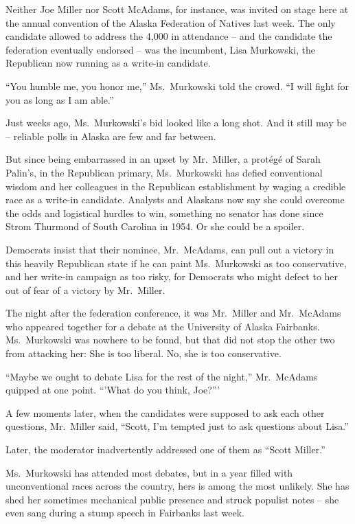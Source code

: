 ﻿\documentclass[12pt]{article}
\begin{document}
Neither Joe Miller nor Scott McAdams, for instance, was invited on stage here at the annual
convention of the Alaska Federation of Natives last week. The only candidate allowed to address the
4,000 in attendance -- and the candidate the federation eventually endorsed -- was the incumbent,
Lisa Murkowski, the Republican now running as a write-in candidate.

``You humble me, you honor me,'' Ms.~Murkowski told the crowd. ``I will fight for you as long as I
am able.''

Just weeks ago, Ms.~Murkowski's bid looked like a long shot. And it still may be -- reliable polls
in Alaska are few and far between.

But since being embarrassed in an upset by Mr.~Miller, a prot\'eg\'e of Sarah Palin's, in the
Republican primary, Ms.~Murkowski has defied conventional wisdom and her colleagues in the
Republican establishment by waging a credible race as a write-in candidate. Analysts and Alaskans
now say she could overcome the odds and logistical hurdles to win, something no senator has done
since Strom Thurmond of South Carolina in 1954. Or she could be a spoiler.

Democrats insist that their nominee, Mr.~McAdams, can pull out a victory in this heavily Republican
state if he can paint Ms.~Murkowski as too conservative, and her write-in campaign as too risky, for
Democrats who might defect to her out of fear of a victory by Mr.~Miller.

The night after the federation conference, it was Mr.~Miller and Mr.~McAdams who appeared together
for a debate at the University of Alaska Fairbanks. Ms.~Murkowski was nowhere to be found, but that
did not stop the other two from attacking her: She is too liberal. No, she is too conservative.

``Maybe we ought to debate Lisa for the rest of the night,'' Mr.~McAdams quipped at one point.
``'What do you think, Joe?'''

A few moments later, when the candidates were supposed to ask each other questions, Mr.~Miller said,
``Scott, I'm tempted just to ask questions about Lisa.''

Later, the moderator inadvertently addressed one of them as ``Scott Miller.''

Ms.~Murkowski has attended most debates, but in a year filled with unconventional races across the
country, hers is among the most unlikely. She has shed her sometimes mechanical public presence and
struck populist notes -- she even sang during a stump speech in Fairbanks last week.
\end{document}
